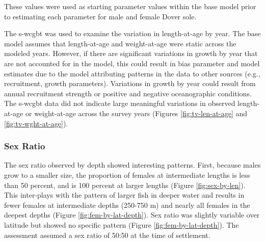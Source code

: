 \documentclass[11pt,
  english,
  a4paper,
]{article}
\begin{document}
\vspace{0.50cm}


These values were used as starting parameter values within the base model prior to estimating each parameter for male and female Dover sole.

\leavevmode\tagmcend\tagstructend\par


The \gls{s-wcgbt} was used to examine the variation in length-at-age by year. The base model assumes that length-at-age and weight-at-age were static across the modeled years. However, if there are significant variations in growth by year that are not accounted for in the model, this could result in bias parameter and model estimates due to the model attributing patterns in the data to other sources (e.g., recruitment, growth parameters). Variations in growth by year could result from annual recruitment strength or positive and negative oceanographic conditions. The \gls{s-wcgbt} data did not indicate large meaningful variations in observed length-at-age or weight-at-age across the survey years (Figures \ref{fig:tv-len-at-age} and \ref{fig:tv-wght-at-age}).

\leavevmode\tagmcend\tagstructend\par


\hypertarget{sex-ratio}{%
\subsubsection{Sex Ratio}\label{sex-ratio}}

\leavevmode\tagmcend\tagstructend


The sex ratio observed by depth showed interesting patterns. First, because males grow to a smaller size, the proportion of females at intermediate lengths is less than 50 percent, and is 100 percent at larger lengths (Figure \ref{fig:sex-by-len}). This inter-plays with the pattern of larger fish in deeper water and results in fewer females at intermediate depths (250-750 m) and nearly all females in the deepest depths (Figure \ref{fig:fem-by-lat-depth}). Sex ratio was slightly variable over latitude but showed no specific pattern (Figure \ref{fig:fem-by-lat-depth}). The assessment assumed a sex ratio of 50:50 at the time of settlement.
\end{document}
